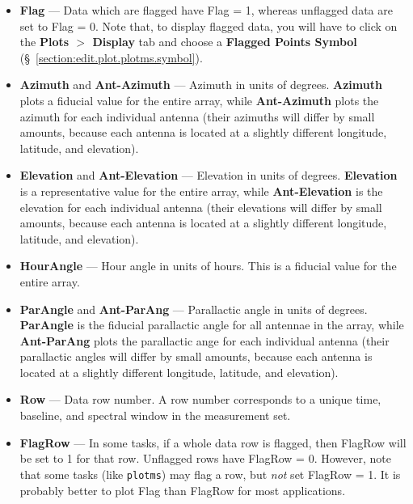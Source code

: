 \begin{itemize}
\item {\bf Flag} --- Data which are flagged have Flag = 1, whereas unflagged data are set to Flag = 0. Note that, to display flagged data, you will have to click on the {\bf Plots $>$ Display} tab and choose a {\bf Flagged Points Symbol} (\S~\ref{section:edit.plot.plotms.symbol}).

\item {\bf Azimuth} and {\bf Ant-Azimuth} --- Azimuth in units of degrees. {\bf Azimuth} plots a fiducial value for the entire array, while {\bf Ant-Azimuth} plots the azimuth for each individual antenna (their azimuths will differ by small amounts, because each antenna is located at a slightly different longitude, latitude, and elevation).

\item {\bf Elevation} and {\bf Ant-Elevation} --- Elevation in units
  of degrees. {\bf Elevation} is a representative value for the entire
  array, while {\bf Ant-Elevation} is the elevation for each
  individual antenna (their elevations will differ by small amounts,
  because each antenna is located at a slightly different longitude,
  latitude, and elevation).

\item {\bf HourAngle} --- Hour angle in units of hours. This is a fiducial value for the entire array.

\item {\bf ParAngle} and {\bf Ant-ParAng} --- Parallactic angle in
  units of degrees. {\bf ParAngle} is the fiducial parallactic angle
  for all antennae in the array, while {\bf Ant-ParAng} plots the
  parallactic ange for each individual antenna (their parallactic
  angles will differ by small amounts, because each antenna is located
  at a slightly different longitude, latitude, and elevation).

\item {\bf Row} --- Data row number. A row number corresponds to a
  unique time, baseline, and spectral window in the measurement set.

\item {\bf FlagRow} --- In some tasks, if a whole data row is flagged,
  then FlagRow will be set to 1 for that row. Unflagged rows have
  FlagRow = 0. However, note that some tasks (like {\tt plotms}) may
  flag a row, but {\it not} set FlagRow = 1. It is probably better to
  plot Flag than FlagRow for most applications.
\end{itemize}


